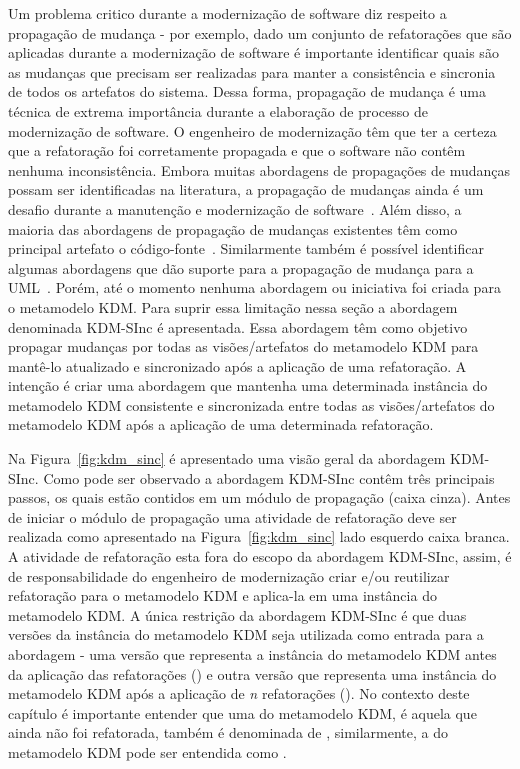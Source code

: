 Um problema critico durante a modernização de software diz respeito a propagação de mudança - por exemplo,  dado um conjunto de refatorações que são aplicadas durante a modernização de software é importante identificar quais são as mudanças que precisam ser realizadas para manter a consistência e sincronia de todos os artefatos do sistema. Dessa forma, propagação de mudança é uma técnica de extrema importância durante a elaboração de processo de modernização de software. O engenheiro de modernização têm que ter a certeza que a refatoração foi corretamente propagada e que o software não contêm nenhuma inconsistência. Embora muitas abordagens de propagações de mudanças possam ser identificadas na literatura, a propagação de mudanças ainda é um desafio durante a manutenção e modernização de software~\cite{Tom_2008_roadmap}. Além disso, a maioria das abordagens de propagação de mudanças existentes têm como principal artefato o código-fonte~\cite{Vaclav_methodology, Deursen07model_drivensoftware}. Similarmente também é possível identificar algumas abordagens que dão suporte para a propagação de mudança para a UML~\cite{Egyed_2008,Liu02rule, Briand_2006}. Porém, até o momento nenhuma abordagem ou iniciativa foi criada para o metamodelo KDM. Para suprir essa limitação nessa seção a abordagem denominada KDM-SInc é apresentada. Essa abordagem têm como objetivo propagar mudanças por todas as visões/artefatos do metamodelo KDM para mantê-lo atualizado e sincronizado após a aplicação de uma refatoração. A intenção é criar uma abordagem que mantenha uma determinada instância do metamodelo KDM consistente e sincronizada entre todas as visões/artefatos do metamodelo KDM após a aplicação de uma determinada refatoração. 

Na Figura~\ref{fig:kdm_sinc} é apresentado uma visão geral da abordagem KDM-SInc. Como pode ser observado a abordagem KDM-SInc contêm três principais passos, os quais estão contidos em um módulo de propagação (caixa cinza). Antes de iniciar o módulo de propagação uma atividade de refatoração deve ser realizada como apresentado na Figura~\ref{fig:kdm_sinc} lado esquerdo caixa branca. A atividade de refatoração esta fora do escopo da abordagem KDM-SInc, assim, é de responsabilidade do engenheiro de modernização criar e/ou reutilizar refatoração para o metamodelo KDM e aplica-la em uma instância do metamodelo KDM. A única restrição da abordagem KDM-SInc é que duas versões da instância do metamodelo KDM seja utilizada como entrada para a abordagem - uma versão que representa a instância do metamodelo KDM antes da aplicação das refatorações () e outra versão que representa uma instância do metamodelo KDM após a aplicação de \textit{n} refatorações (). No contexto deste capítulo é importante entender que uma  do metamodelo KDM, é aquela que ainda não foi refatorada, também é denominada de , similarmente, a  do metamodelo KDM pode ser entendida como . 

